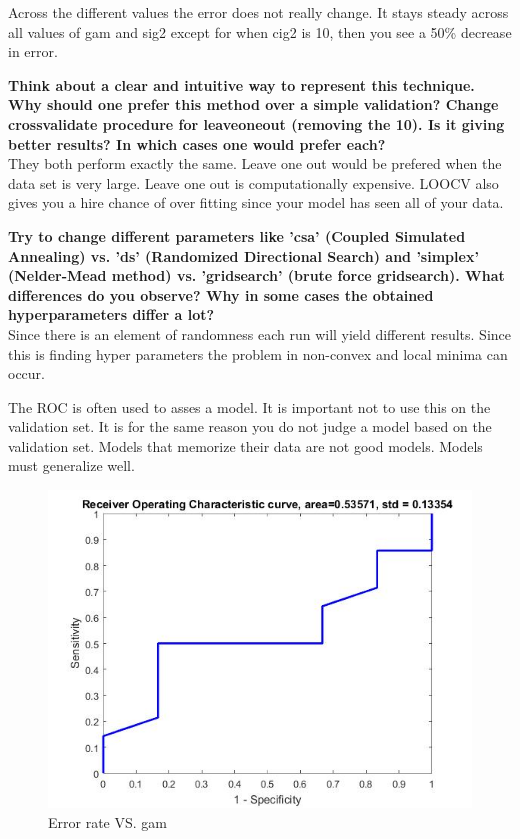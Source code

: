 \documentclass[11pt,oneside,a4paper]{article}
\begin{document}
Across the different values the error does not really change. It stays steady across all values of gam and sig2 except for when cig2 is 10, then you see a 50\% decrease in error.

\textbf{Think about a clear and intuitive way to represent this technique. Why should one prefer this method
over a simple validation? Change crossvalidate procedure for leaveoneout (removing the
10). Is it giving better results? In which cases one would prefer each?}\\

They both perform exactly the same. Leave one out would be prefered when the data set is very large. Leave one out is computationally expensive. LOOCV also gives you a hire chance of over fitting since your model has seen all of your data. 

\textbf{Try to change different parameters like 'csa' (Coupled Simulated Annealing) vs. 'ds' (Randomized
Directional Search) and 'simplex' (Nelder-Mead method) vs. 'gridsearch' (brute force
gridsearch). What differences do you observe? Why in some cases the obtained hyperparameters differ
a lot?}\\

Since there is an element of randomness each run will yield different results. Since this is finding hyper parameters the problem in non-convex and local minima can occur. 

The ROC is often used to asses a model. It is important not to use this on the validation set. It is for the same reason you do not judge a model based on the validation set. Models that memorize their data are not good models. Models must generalize well. 

\begin{figure}[H]
	\centering
	\includegraphics[scale=0.4]{../Figures/ROC}
	\caption{Error rate VS. gam}
\end{figure}
\end{document}

